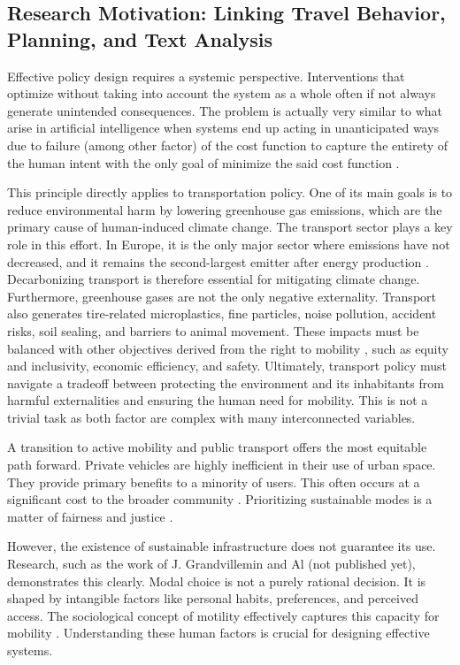 \newpage

\subsection{Research Motivation: Linking Travel Behavior, Planning, and Text Analysis}

Effective policy design requires a systemic perspective. Interventions that optimize without taking into account the system as a whole often if not always generate unintended consequences\cite{merton_unanticipated_1936}. The problem is actually very similar to what arise in artificial intelligence when systems end up acting in unanticipated ways due to failure (among other factor) of the cost function to capture the entirety of the human intent with the only goal of minimize the said cost function \cite{maier_take_2025}.

This principle directly applies to transportation policy. One of its main goals is to reduce environmental harm by lowering greenhouse gas emissions, which are the primary cause of human-induced climate change. The transport sector plays a key role in this effort. In Europe, it is the only major sector where emissions have not decreased, and it remains the second-largest emitter after energy production \cite{noauthor_co2_2019}. Decarbonizing transport is therefore essential for mitigating climate change. Furthermore, greenhouse gases are not the only negative externality. Transport also generates tire-related microplastics, fine particles, noise pollution, accident risks, soil sealing, and barriers to animal movement. These impacts must be balanced with other objectives derived from the right to mobility \cite{nations_universal_nodate}, such as equity and inclusivity, economic efficiency, and safety. Ultimately, transport policy must navigate a tradeoff between protecting the environment and its inhabitants from harmful externalities and ensuring the human need for mobility. This is not a trivial task as both factor are complex with many interconnected variables.

A transition to active mobility and public transport offers the most equitable path forward. Private vehicles are highly inefficient in their use of urban space. They provide primary benefits to a minority of users. This often occurs at a significant cost to the broader community \cite{litman_evaluating_2007}. Prioritizing sustainable modes is a matter of fairness and justice \cite{guo_case_nodate}.

However, the existence of sustainable infrastructure does not guarantee its use. Research, such as the work of J. Grandvillemin and Al (not published yet), demonstrates this clearly. Modal choice is not a purely rational decision. It is shaped by intangible factors like personal habits, preferences, and perceived access. The sociological concept of motility effectively captures this capacity for mobility \cite{kaufmann_motility_2004}. Understanding these human factors is crucial for designing effective systems.

